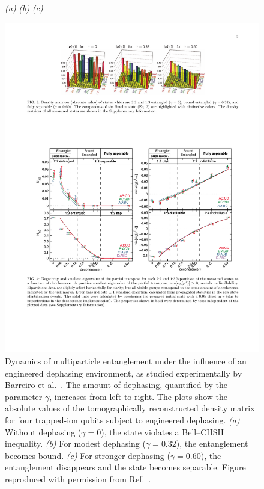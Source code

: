 \documentclass[3p,sort&compress,12pt]{elsarticle}
\begin{document}
\begin{figure}
{\footnotesize \hspace{1.4cm}\emph{(a)} \hspace{3.95cm} \emph{(b)} \hspace{3.85cm} \emph{(c)} }

\centering
\includegraphics[scale=1.1]{entan.pdf}
\caption{Dynamics of multiparticle entanglement under the influence of an engineered dephasing environment, as studied experimentally by Barreiro et al.\ \cite{Barreiro:2010:aa}. The amount of dephasing, quantified by the parameter $\gamma$, increases from left to right. The plots show the absolute values of the tomographically reconstructed density matrix for four trapped-ion qubits subject to engineered dephasing. \emph{(a)} Without dephasing  ($\gamma=0$), the state violates a Bell--CHSH inequality. \emph{(b)} For modest dephasing ($\gamma=0.32$), the entanglement becomes bound. \emph{(c)} For stronger dephasing ($\gamma=0.60$), the entanglement disappears and the state becomes separable.  Figure reproduced with permission from Ref.~\cite{Barreiro:2010:aa}. }
\label{fig:entan}
\end{figure}
\end{document}
